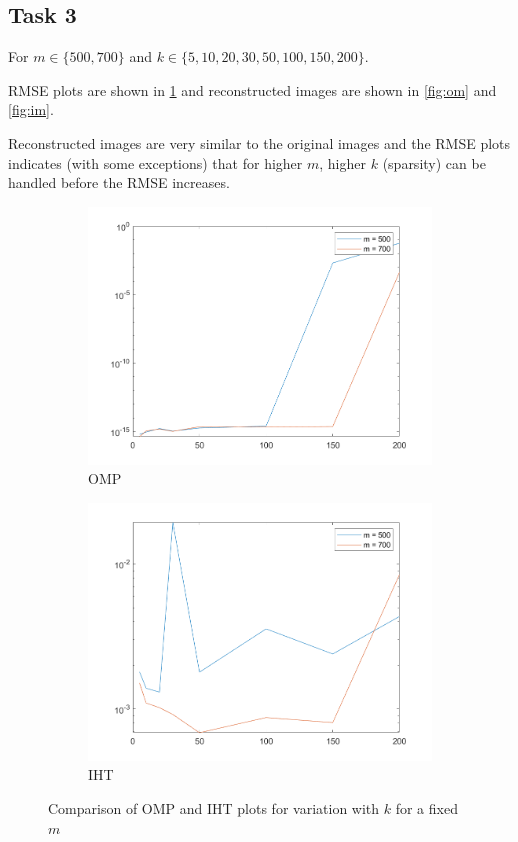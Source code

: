 \documentclass[a4paper, landscape]{article}
\begin{document}
\subsection{Task 3}
For $m \in \{500,700\}$ and $k \in \{5,10,20,30,50,100,150,200\}$.

RMSE plots are shown in \ref{fig:cm} and reconstructed images are shown in \ref{fig:om} and \ref{fig:im}.

Reconstructed images are very similar to the original images and the RMSE plots indicates (with some exceptions) that for higher $m$, higher $k$ (sparsity) can be handled before the RMSE increases.
\begin{figure}[H]
    \centering
    \begin{subfigure}{0.45\linewidth}
        \centering
        \includegraphics[width=\linewidth]{omp/plot m.png}
        \caption{OMP}
    \end{subfigure}
    \begin{subfigure}{0.45\linewidth}
        \centering
        \includegraphics[width=\linewidth]{iht/plot m.png}
        \caption{IHT}
    \end{subfigure}
    \caption{Comparison of OMP and IHT plots for variation with $k$ for a fixed $m$}
    \label{fig:cm}
\end{figure}
\end{document}
